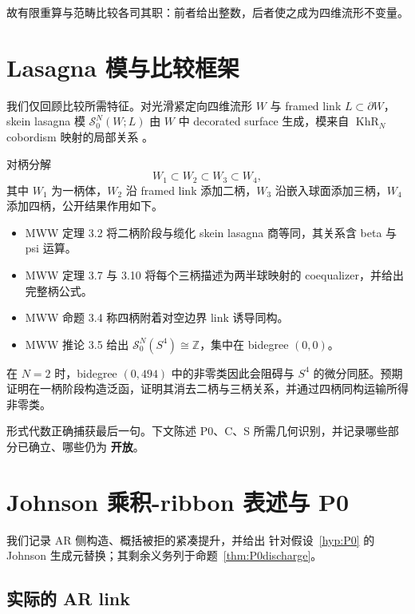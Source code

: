\documentclass[11pt]{amsart}
\theoremstyle{definition}
\theoremstyle{remark}
\newcommand{\Z}{\mathbb{Z}}
\newcommand{\SN}{\mathcal{S}^{N}_{0}}
\newcommand{\KhR}{\operatorname{KhR}}
\newcommand{\Open}{\textbf{开放}}
\begin{document}
故有限重算与范畴比较各司其职：前者给出整数，后者使之成为四维流形不变量。


\section{Lasagna 模与比较框架}

我们仅回顾比较所需特征。对光滑紧定向四维流形 $W$ 与 framed link $L\subset\partial W$，skein lasagna 模 $\SN(W;L)$ 由 $W$ 中 decorated surface 生成，模来自 $\KhR_N$ cobordism 映射的局部关系 \cite{MorrisonWalkerWedrich2019,ManolescuWalkerWedrich2023}。

对柄分解
\[
W_1\subset W_2\subset W_3\subset W_4,
\]
其中 $W_1$ 为一柄体，$W_2$ 沿 framed link 添加二柄，$W_3$ 沿嵌入球面添加三柄，$W_4$ 添加四柄，公开结果作用如下。
\begin{itemize}
\item MWW 定理 3.2 将二柄阶段与缆化 skein lasagna 商等同，其关系含 beta 与 psi 运算。
\item MWW 定理 3.7 与 3.10 将每个三柄描述为两半球映射的 coequalizer，并给出完整柄公式。
\item MWW 命题 3.4 称四柄附着对空边界 link 诱导同构。
\item MWW 推论 3.5 给出 $\SN(S^4)\cong\Z$，集中在 bidegree $(0,0)$。
\end{itemize}

在 $N=2$ 时，bidegree $(0,494)$ 中的非零类因此会阻碍与 $S^4$ 的微分同胚。预期证明在一柄阶段构造泛函，证明其消去二柄与三柄关系，并通过四柄同构运输所得非零类。

形式代数正确捕获最后一句。下文陈述 P0、C、S 所需几何识别，并记录哪些部分已确立、哪些仍为 \Open。
\section{Johnson 乘积-ribbon 表述与 P0}\label{sec:johnson-presentation}

我们记录 AR 侧构造、概括被拒的紧凑提升，并给出
针对假设~\ref{hyp:P0} 的 Johnson 生成元替换；其剩余义务列于命题~\ref{thm:P0discharge}。

\subsection{实际的 AR link}
\end{document}
